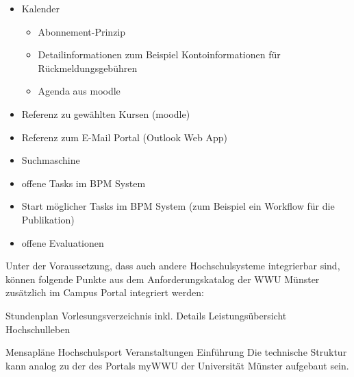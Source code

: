 \documentclass[a4paper]{article}
\newcommand\liststyleLii{%
\renewcommand\labelitemi{•}
\renewcommand\labelitemii{◦}
\renewcommand\labelitemiii{${\blacksquare}$}
\renewcommand\labelitemiv{•}
}
\begin{document}
\liststyleLii
\begin{itemize}
\item {\sffamily
Kalender}

\begin{itemize}
\item {\sffamily
Abonnement-Prinzip}
\item {\sffamily
Detailinformationen zum Beispiel Kontoinformationen für Rückmeldungsgebühren}
\item {\sffamily
Agenda aus moodle}
\end{itemize}
\item {\sffamily
Referenz zu gewählten Kursen (moodle)}
\item {\sffamily
Referenz zum E-Mail Portal (Outlook Web App)}
\item {\sffamily
Suchmaschine}
\item {\sffamily
offene Tasks im BPM System}
\item {\sffamily
Start möglicher Tasks im BPM System (zum Beispiel ein Workflow für die Publikation)}
\item {\sffamily
offene Evaluationen}
\end{itemize}
{\sffamily
Unter der Voraussetzung, dass auch andere Hochschulsysteme integrierbar sind, können folgende Punkte aus dem
Anforderungskatalog der WWU Münster zusätzlich im Campus Portal integriert werden:}

{\sffamily
Stundenplan}
{\sffamily
Vorlesungsverzeichnis inkl. Details}
{\sffamily
Leistungsübersicht}
{\sffamily
Hochschulleben}

{\sffamily
Mensapläne}
{\sffamily
Hochschulsport}
{\sffamily
Veranstaltungen}
{\sffamily
Einführung}
{\sffamily
Die technische Struktur kann analog zu der des Portals myWWU der Universität Münster aufgebaut sein.}
\end{document}
